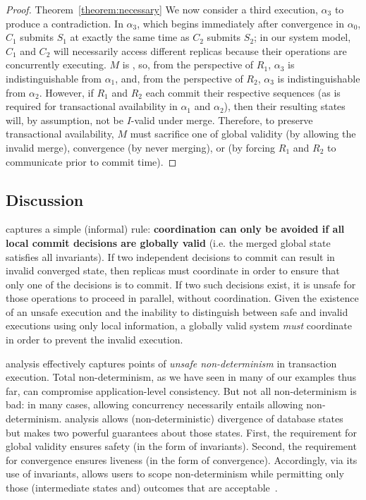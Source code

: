 \begin{proof}{Theorem~\ref{theorem:necessary}}
   We now consider a third execution, $\alpha_3$ to produce a
   contradiction. In $\alpha_3$, which begins immediately after
   convergence in $\alpha_0$, $C_1$ submits $S_1$ at exactly the same
   time as $C_2$ submits $S_2$; in our system model, $C_1$ and $C_2$
   will necessarily access different replicas because their operations
   are concurrently executing. $M$ is \cfree, so, from the perspective
   of $R_1$, $\alpha_3$ is indistinguishable from $\alpha_1$, and,
   from the perspective of $R_2$, $\alpha_3$ is indistinguishable from
   $\alpha_2$. However, if $R_1$ and $R_2$ each commit their
   respective sequences (as is required for transactional availability
   in $\alpha_1$ and $\alpha_2$), then their resulting states will, by
   assumption, not be $I$-valid under merge. Therefore, to preserve
   transactional availability, $M$ must sacrifice one of global
   validity (by allowing the invalid merge), convergence (by never
   merging), or \cfreedom (by forcing $R_1$ and $R_2$ to communicate
   prior to commit time).
\end{proof}

\subsection{Discussion}

\iconfluence captures a simple (informal) rule: \textbf{coordination
  can only be avoided if all local commit decisions are globally
  valid} (i.e. the merged global state satisfies all invariants). If
two independent decisions to commit can result in invalid converged
state, then replicas must coordinate in order to ensure that only one
of the decisions is to commit. If two such decisions exist, it is
unsafe for those operations to proceed in parallel, without
coordination. Given the existence of an unsafe execution and the
inability to distinguish between safe and invalid executions using
only local information, a globally valid system \textit{must}
coordinate in order to prevent the invalid execution.

\iconfluence analysis effectively captures points of \textit{unsafe
  non-determinism} in transaction execution. Total non-determinism, as
we have seen in many of our examples thus far, can compromise
application-level consistency. But not all non-determinism is bad: in
many cases, allowing concurrency necessarily entails allowing
non-determinism. \iconfluence analysis allows (non-deterministic)
divergence of database states but makes two powerful guarantees about
those states. First, the requirement for global validity ensures
safety (in the form of invariants). Second, the requirement for
convergence ensures liveness (in the form of
convergence). Accordingly, via its use of invariants, \iconfluence
allows users to scope non-determinism while permitting only those
(intermediate states and) outcomes that are
acceptable~\cite{consistency-borders}.

